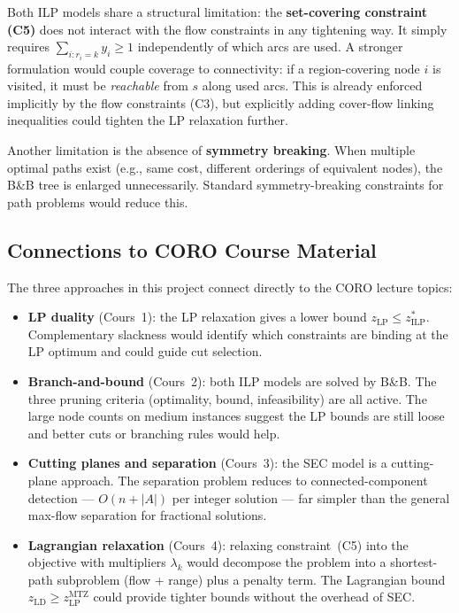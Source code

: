 \documentclass[12pt, a4paper]{article}
\begin{document}
Both ILP models share a structural limitation: the \textbf{set-covering constraint
(C5)} does not interact with the flow constraints in any tightening way. It simply
requires $\sum_{i: r_i = k} y_i \geq 1$ independently of which arcs are used.
A stronger formulation would couple coverage to connectivity: if a region-covering
node $i$ is visited, it must be \emph{reachable} from $s$ along used arcs. This is
already enforced implicitly by the flow constraints (C3), but explicitly adding
cover-flow linking inequalities could tighten the LP relaxation further.

Another limitation is the absence of \textbf{symmetry breaking}. When multiple
optimal paths exist (e.g., same cost, different orderings of equivalent nodes), the
B\&B tree is enlarged unnecessarily. Standard symmetry-breaking constraints for
path problems would reduce this.

\subsection{Connections to CORO Course Material}

The three approaches in this project connect directly to the CORO lecture topics:
\begin{itemize}[nosep]
  \item \textbf{LP duality} (Cours~1): the LP relaxation gives a lower bound
        $z_{\mathrm{LP}} \leq z_{\mathrm{ILP}}^*$. Complementary slackness would
        identify which constraints are binding at the LP optimum and could guide
        cut selection.
  \item \textbf{Branch-and-bound} (Cours~2): both ILP models are solved by B\&B.
        The three pruning criteria (optimality, bound, infeasibility) are all active.
        The large node counts on medium instances suggest the LP bounds are still
        loose and better cuts or branching rules would help.
  \item \textbf{Cutting planes and separation} (Cours~3): the SEC model is a
        cutting-plane approach. The separation problem reduces to connected-component
        detection --- $O(n + |A|)$ per integer solution --- far simpler than the
        general max-flow separation for fractional solutions.
  \item \textbf{Lagrangian relaxation} (Cours~4): relaxing constraint~(C5) into the
        objective with multipliers $\lambda_k$ would decompose the problem into a
        shortest-path subproblem (flow + range) plus a penalty term. The Lagrangian
        bound $z_{\mathrm{LD}} \geq z_{\mathrm{LP}}^{\mathrm{MTZ}}$ could provide
        tighter bounds without the overhead of SEC.
\end{itemize}
\end{document}
